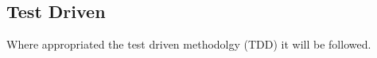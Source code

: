 \subsection{Test Driven} 
Where appropriated the test driven methodolgy (TDD) it will be followed. 
